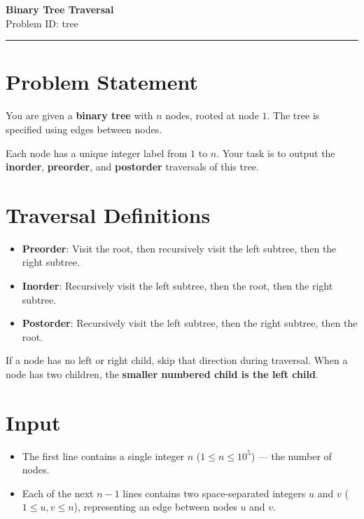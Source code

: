 \documentclass[12pt,a4paper]{article}
\begin{document}
\begin{center}
    {\LARGE \textbf{Binary Tree Traversal}} \\[0.5em]
    {Problem ID: tree} \\[1em]
    \rule{\textwidth}{0.4pt}
\end{center}

\vspace{1em}

\section*{Problem Statement}
You are given a \textbf{binary tree} with $n$ nodes, rooted at node $1$.  
The tree is specified using edges between nodes.  

Each node has a unique integer label from $1$ to $n$.  
Your task is to output the \textbf{inorder}, \textbf{preorder}, and \textbf{postorder} traversals of this tree.

\section*{Traversal Definitions}
\begin{itemize}
  \item \textbf{Preorder}: Visit the root, then recursively visit the left subtree, then the right subtree.  
  \item \textbf{Inorder}: Recursively visit the left subtree, then the root, then the right subtree.  
  \item \textbf{Postorder}: Recursively visit the left subtree, then the right subtree, then the root.  
\end{itemize}

If a node has no left or right child, skip that direction during traversal.  
When a node has two children, the \textbf{smaller numbered child is the left child}.  

\section*{Input}
\begin{itemize}
    \item The first line contains a single integer $n$ ($1 \le n \le 10^5$) — the number of nodes.  
    \item Each of the next $n-1$ lines contains two space-separated integers $u$ and $v$ ($1 \le u, v \le n$), representing an edge between nodes $u$ and $v$.  
\end{itemize}
\end{document}
